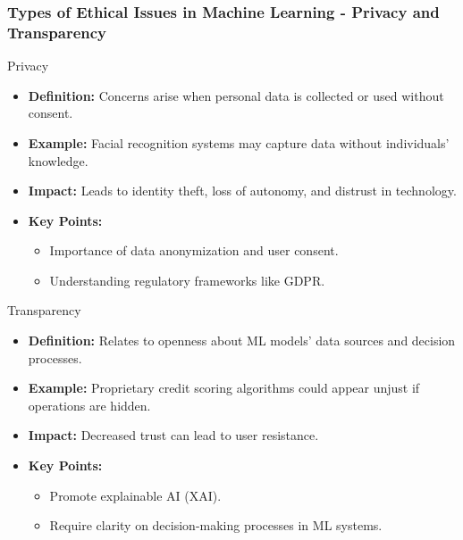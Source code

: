 \documentclass[aspectratio=169]{beamer}
\begin{document}
\begin{frame}[fragile]
    \frametitle{Types of Ethical Issues in Machine Learning - Privacy and Transparency}
    \begin{block}{Privacy}
        \begin{itemize}
            \item \textbf{Definition:} Concerns arise when personal data is collected or used without consent.
            \item \textbf{Example:} Facial recognition systems may capture data without individuals' knowledge.
            \item \textbf{Impact:} Leads to identity theft, loss of autonomy, and distrust in technology.
            \item \textbf{Key Points:}
                \begin{itemize}
                    \item Importance of data anonymization and user consent.
                    \item Understanding regulatory frameworks like GDPR.
                \end{itemize}
        \end{itemize}
    \end{block}
    \begin{block}{Transparency}
        \begin{itemize}
            \item \textbf{Definition:} Relates to openness about ML models' data sources and decision processes.
            \item \textbf{Example:} Proprietary credit scoring algorithms could appear unjust if operations are hidden.
            \item \textbf{Impact:} Decreased trust can lead to user resistance.
            \item \textbf{Key Points:}
                \begin{itemize}
                    \item Promote explainable AI (XAI).
                    \item Require clarity on decision-making processes in ML systems.
                \end{itemize}
        \end{itemize}
    \end{block}
\end{frame}
\end{document}
